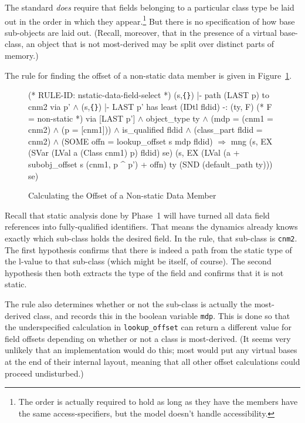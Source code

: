 \documentclass[11pt]{article}
\newcommand{\lbr}{\texttt{\{}}
\newcommand{\rbr}{\texttt{\}}}
\begin{document}
The standard \emph{does} require that fields belonging to a particular
class type be laid out in the order in which they appear.\footnote{The
  order is actually required to hold as long as they have the members
  have the same access-specifiers, but the model doesn't handle
  accessibility.}  But there is no specification of how base
sub-objects are laid out.  (Recall, moreover, that in the presence of
a virtual base-class, an object that is not most-derived may be split
over distinct parts of memory.)

The rule for finding the offset of a non-static data member is given
in Figure~\ref{fig:nstatic-data-field-select}.
\begin{figure}
%
\begin{stdrule}
(* RULE-ID: nstatic-data-field-select *)
     (s,\lbr\rbr) |- path (LAST p) to cnm2 via p' \(\land\)
     (s,\lbr\rbr) |- LAST p' has least
                 (IDtl fldid) -: (ty, F)  (* F = non-static *)
                 via [LAST p'] \(\land\)
     object_type ty \(\land\)
     (mdp = (cnm1 = cnm2) \(\land\) (p = [cnm1])) \(\land\)
     is_qualified fldid \(\land\)
     (class_part fldid = cnm2) \(\land\)
     (SOME offn = lookup_offset s mdp fldid)
   \(\Rightarrow\)
     mng (s, EX (SVar (LVal a (Class cnm1) p) fldid) se)
         (s, EX (LVal
                  (a + subobj_offset s (cnm1, p ^ p') + offn)
                  ty
                  (SND (default_path ty))) se)
\end{stdrule}
\caption{Calculating the Offset of a Non-static Data Member}
\label{fig:nstatic-data-field-select}
\end{figure}
Recall that static analysis done by Phase~1 will have turned all data
field references into fully-qualified identifiers.  That means the
dynamics already knows exactly which sub-class holds the desired
field.  In the rule, that sub-class is \texttt{cnm2}.  The first
hypothesis confirms that there is indeed a path from the static type
of the l-value to that sub-class (which might be itself, of course).
The second hypothesis then both extracts the type of the field and
confirms that it is not static.

The rule also determines whether or not the sub-class is actually the
most-derived class, and records this in the boolean variable
\texttt{mdp}.  This is done so that the underspecified calculation in
\texttt{lookup_offset} can return a different value for field offsets
depending on whether or not a class is most-derived.  (It seems very
unlikely that an implementation would do this; most would put any
virtual bases at the end of their internal layout, meaning that all
other offset calculations could proceed undisturbed.)
\end{document}
